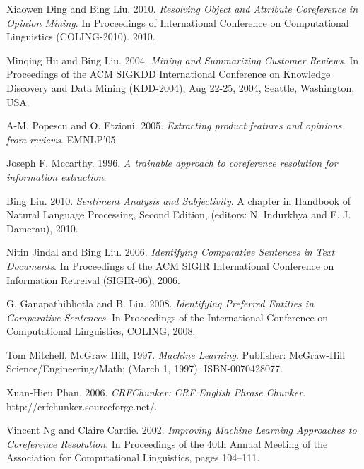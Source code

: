 \documentclass[12pt]{extarticle}
\begin{document}
\renewcommand{\refname}{Tham khảo} 

\newpage
\begin{thebibliography}{30}

	Xiaowen Ding and Bing Liu. 2010.
	\textit{Resolving Object and Attribute Coreference in Opinion Mining}. 
	In Proceedings of International Conference on Computational Linguistics (COLING-2010). 2010.
	 
	Minqing Hu and Bing Liu. 2004.
	\textit{Mining and Summarizing Customer Reviews}.
	In Proceedings of the ACM SIGKDD International Conference on Knowledge Discovery and Data Mining (KDD-2004), Aug 22-25, 2004, Seattle, Washington, USA.

	A-M. Popescu and O. Etzioni. 2005. 
	\textit{Extracting product features and opinions from reviews}.
	EMNLP’05.

	Joseph F. Mccarthy. 1996.
 	\textit{A trainable approach to coreference resolution for information extraction}.

 	Bing Liu. 2010.
 	\textit{Sentiment Analysis and Subjectivity}. A chapter in 
  	Handbook of Natural Language Processing, Second Edition, 
  	(editors: N. Indurkhya and F. J. Damerau), 2010.

  	Nitin Jindal and Bing Liu. 2006.  
  	\textit{Identifying Comparative Sentences in Text Documents}. 
   	In Proceedings of the ACM SIGIR International Conference on 
   	Information Retreival (SIGIR-06), 2006.

	G. Ganapathibhotla and B. Liu. 2008.
	\textit{Identifying Preferred Entities in Comparative Sentences}.
	In Proceedings of the International Conference on Computational Linguistics, COLING, 2008.

	Tom Mitchell, McGraw Hill, 1997.
	\textit{Machine Learning}.
	Publisher: McGraw-Hill Science/Engineering/Math; (March 1, 1997). ISBN-0070428077.	

	Xuan-Hieu Phan. 2006.
	\textit{CRFChunker: CRF English Phrase Chunker}. 
	http://crfchunker.sourceforge.net/.

	Vincent Ng and Claire Cardie. 2002.
	\textit{Improving Machine Learning Approaches to Coreference Resolution}.
	In Proceedings of the 40th Annual Meeting of the Association for Computational Linguistics, pages 104–111.


\end{thebibliography}
\end{document}

